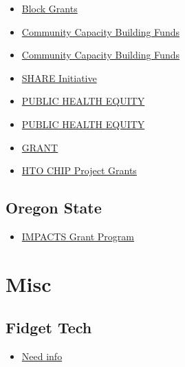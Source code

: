 \documentclass[
  letterpaper,
  DIV=11,
  numbers=noendperiod]{scrreprt}
\providecommand{\tightlist}{%
  \setlength{\itemsep}{0pt}\setlength{\parskip}{0pt}}\usepackage{longtable,booktabs,array}
\begin{document}
\begin{itemize}
\tightlist
\item
  \href{https://www.oregon.gov/oha/hsd/amhpac/pages/block-grants.aspx}{Block
  Grants}
\item
  \href{https://www.oregon.gov/oha/hsd/medicaid-policy/pages/ccbf.aspx}{Community
  Capacity Building Funds}
\item
  \href{https://content.govdelivery.com/accounts/ORHA/bulletins/38e15e8}{Community
  Capacity Building Funds}
\item
  \href{https://www.oregon.gov/oha/hpa/dsi-tc/pages/share.aspx}{SHARE
  Initiative}
\item
  \href{https://www.oregon.gov/oha/PH/ABOUT/MODCET\%20CBO\%20Documents/PH\%20Equity\%20CBO\%20Fiscal\%20Guidance\%20-\%20AY25\%20\%20DRAFT-\%2002.28.24.pdf}{PUBLIC
  HEALTH EQUITY}
\item
  \href{https://content.govdelivery.com/accounts/ORHA/bulletins/37611cc}{PUBLIC
  HEALTH EQUITY}
\item
  \href{https://www.oregon.gov/oha/ph/healthypeoplefamilies/youth/healthschool/schoolbasedhealthcenters/pages/mh-expansion-grant.aspx}{GRANT}
\item
  \href{https://www.oregon.gov/oha/PH/ABOUT/Documents/HTO\%20CHIP\%202024\%20FAQ.pdf}{HTO
  CHIP Project Grants}
\end{itemize}

\subsection{Oregon State}\label{oregon-state}

\begin{itemize}
\tightlist
\item
  \href{https://www.oregon.gov/cjc/impacts/Documents/2020_IMPACTSOnePager.pdf}{IMPACTS
  Grant Program}
\end{itemize}

\section{Misc}\label{misc}

\subsection{Fidget Tech}\label{fidget-tech}

\begin{itemize}
\tightlist
\item
  \href{https://www.fidgetech.org/}{Need info}
\end{itemize}
\end{document}
